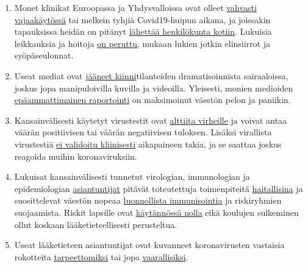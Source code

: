 \begin{enumerate}
\item
  Monet klinikat Euroopassa ja Yhdysvalloissa ovat olleet
  \href{https://www.hsj.co.uk/acute-care/nhs-hospitals-have-four-times-more-empty-beds-than-normal/7027392.article}{vahvasti
  vajaakäytössä} tai melkein tyhjiä Covid19-huipun aikana, ja joissakin
  tapauksissa heidän on pitänyt
  \href{https://eu.usatoday.com/story/news/health/2020/04/02/coronavirus-pandemic-jobs-us-health-care-workers-furloughed-laid-off/5102320002/}{lähettää
  henkilökunta kotiin}. Lukuisia leikkauksia ja hoitoja
  \href{https://www.sfchronicle.com/bayarea/article/Stanford-hospital-system-to-cut-pay-20-furlough-15227591.php}{on
  peruttu}, mukaan lukien jotkin elinsiirrot ja syöpäseulonnat.
\item
  Useat mediat ovat
  \href{https://nypost.com/2020/04/01/cbs-admits-to-using-footage-from-italy-in-report-about-nyc/}{jääneet
  kiinni}tilanteiden dramatisoinnista sairaaloissa, joskus jopa
  manipuloivilla kuvilla ja videoilla. Yleisesti, monien medioiden
  \href{https://onlinelibrary.wiley.com/doi/full/10.1111/eci.13222}{epäammattimainen
  raportointi} on maksimoinut väestön pelon ja paniikin.
\item
  Kansainvälisesti käytetyt virustestit ovat
  \href{https://www.ncbi.nlm.nih.gov/pubmed/32219885}{alttiita
  virheille} ja voivat antaa väärän positiivisen tai väärän negatiivisen
  tuloksen. Lisäksi virallista virustestiä
  \href{https://www.youtube.com/watch?v=p_AyuhbnPOI}{ei validoitu
  kliinisesti} aikapaineen takia, ja se saattaa joskus reagoida muihin
  koronaviruksiin.
\item
  Lukuisat kansainvälisesti tunnetut virologian, immunologian ja
  epidemiologian
  \href{https://off-guardian.org/2020/03/24/12-experts-questioning-the-coronavirus-panic/}{asiantuntijat}
  pitävät toteutettuja toimenpiteitä
  \href{https://off-guardian.org/2020/03/28/10-more-experts-criticising-the-coronavirus-panic/}{haitallisina}
  ja suosittelevat väestön nopeaa
  \href{https://off-guardian.org/2020/04/17/8-more-experts-questioning-the-coronavirus-panic/}{luonnollista
  immunisointia} ja riskiryhmien suojaamista. Riskit lapsille ovat
  \href{https://www.thelancet.com/journals/lanchi/article/PIIS2352-4642(20)30095-X/fulltext}{käytännössä
  nolla} eikä koulujen sulkeminen ollut koskaan lääketieteellisesti
  perusteltua.
\item
  Useat lääketieteen asiantuntijat ovat kuvanneet koronavirusten
  vastaisia rokotteita
  \href{https://www.youtube.com/watch?v=vrL9QKGQrWk}{tarpeettomiksi} tai
  jopa
  \href{https://www.nature.com/articles/d41586-020-00751-9}{vaarallisiksi}.

\end{enumerate}

